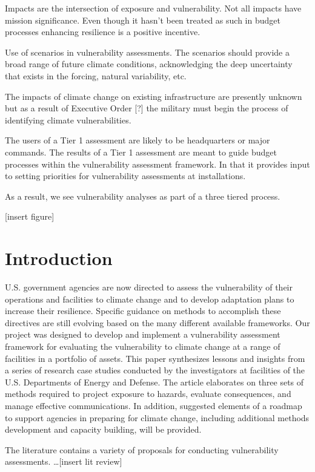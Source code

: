\documentclass[10pt]{amsart}
\begin{document}
Impacts are the intersection of exposure and vulnerability.
Not all impacts have mission significance. 
Even though it hasn't been treated as such in budget processes enhancing resilience is a positive incentive.

Use of scenarios in vulnerability assessments.
The scenarios should provide a broad range of future climate conditions, acknowledging the deep uncertainty that exists in the forcing, natural variability, etc. 


The impacts of climate change on existing infrastructure are presently unknown but as a result of Executive Order [?] the military must begin the process of identifying climate vulnerabilities. 

The users of a Tier 1 assessment are likely to be headquarters or major commands.
The results of a Tier 1 assessment are meant to guide budget processes within the vulnerability assessment framework.
In that it provides input to setting priorities for vulnerability assessments at installations.




As a result, we see vulnerability analyses as part of a three tiered process. 

[insert figure]


\section{Introduction}
U.S. government agencies are now directed to assess the vulnerability of their operations and facilities to climate change and to develop adaptation plans to increase their resilience. 
Specific guidance on methods to accomplish these directives are still evolving based on the many different available frameworks. 
Our project was designed to develop and implement a vulnerability assessment framework for evaluating the vulnerability to climate change at a range of facilities in a portfolio of assets. 
This paper synthesizes lessons and insights from a series of research case studies conducted by the investigators at facilities of the U.S. Departments of Energy and Defense. 
The article elaborates on three sets of methods required to project exposure to hazards, evaluate consequences, and manage effective communications. 
In addition, suggested elements of a roadmap to support agencies in preparing for climate change, including additional methods development and capacity building, will be provided.

The literature contains a variety of proposals for conducting vulnerability assessments. 
\ldots [insert lit review]
\end{document}
